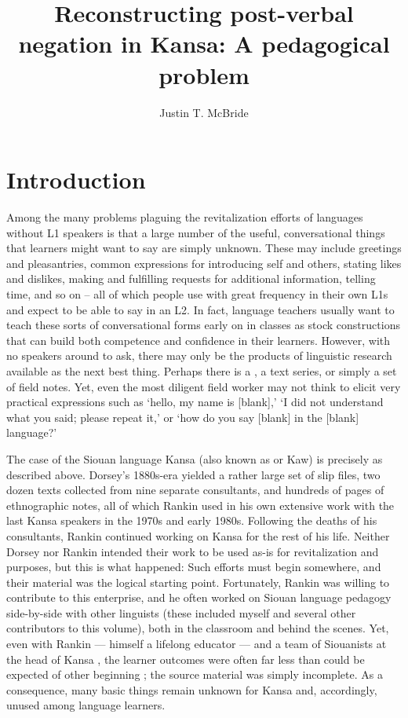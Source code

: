 \documentclass[output=paper]{LSP/langsci}
\author{Justin T. McBride}
\title{Reconstructing post-verbal negation in {Kansa}: {A} pedagogical problem}
\begin{document}
\section{Introduction}
Among the many problems plaguing the revitalization efforts of languages without L1 speakers is that a large number of the useful, conversational things that learners might want to say are simply unknown. These may include greetings and pleasantries, common expressions for introducing self and others, stating likes and dislikes, making and fulfilling requests for additional information, telling time, and so on -- all of which people use with great frequency in their own L1s and expect to be able to say in an L2. In fact, language teachers usually want to teach these sorts of conversational forms early on in classes as stock constructions that can build both competence and confidence in their learners. However, with no speakers around to ask, there may only be the products of linguistic research available as the next best thing. Perhaps there is a , a text series, or simply a set of field notes. Yet, even the most diligent field worker may not think to elicit very practical expressions such as `hello, my name is [blank],' `I did not understand what you said; please repeat it,' or `how do you say [blank] in the [blank] language?' 

 
The case of the  Siouan language Kansa (also known as  or Kaw) is precisely as described above. Dorsey's 1880s-era  yielded a rather large set of slip files, two dozen texts collected from nine separate consultants, and hundreds of pages of ethnographic notes, all of which Rankin used in his own extensive work with the last Kansa speakers in the 1970s and early 1980s. Following the deaths of his consultants, Rankin continued working on Kansa for the rest of his life. Neither Dorsey nor Rankin intended their work to be used as-is for revitalization and  purposes, but this is what happened: Such efforts must begin somewhere, and their material was the logical starting point. Fortunately, Rankin was willing to contribute to this enterprise, and he often worked on Siouan language pedagogy side-by-side with other linguists (these included myself and several other contributors to this volume), both in the classroom and behind the scenes. Yet, even with Rankin --- himself a lifelong educator --- and a team of Siouanists at the head of Kansa , the learner outcomes were often far less than could be expected of other beginning ; the source material was simply incomplete. As a consequence, many basic things remain unknown for Kansa and, accordingly, unused among language learners.
 
\end{document}
